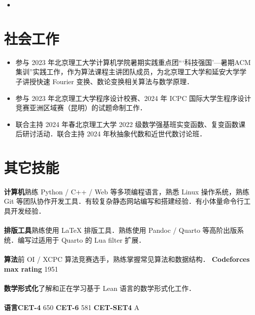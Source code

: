 \documentclass{resume}
\begin{document}
\begin{itemize}
\item {}
\end{itemize}

\section{社会工作}

\begin{itemize}
    \item 参与 2023 年北京理工大学计算机学院暑期实践重点团“‘科技强国’—暑期ACM集训”实践工作，作为算法课程主讲团队成员，为北京理工大学和延安大学学子讲授快速 Fourier 变换、数论变换相关算法与数学原理．
\end{itemize}


\begin{itemize}
    \item 参与 2023 年北京理工大学程序设计校赛、2024 年 ICPC 国际大学生程序设计竞赛亚洲区域赛（昆明）的试题命制工作．
\end{itemize}

\begin{itemize}
    \item 联合主持 2024 年春北京理工大学 2022 级数学强基班实变函数、复变函数课后研讨活动．联合主持 2024 年秋抽象代数和近世代数讨论班．
\end{itemize}

\section{其它技能}
\paragraph{}{\textbf{计算机}\quad 熟练 Python / C++ / Web 等多项编程语言，熟悉 Linux 操作系统，熟练 Git 等团队协作开发工具．有较复杂静态网站编写和搭建经验．有小体量命令行工具开发经验．}
\paragraph{}{\textbf{排版工具}\quad 熟练使用 LaTeX 排版工具．熟练使用 Pandoc / Quarto 等高阶出版系统．编写过适用于 Quarto 的 Lua filter 扩展．}
\paragraph{}{\textbf{算法}\quad 前 OI / XCPC 算法竞赛选手，熟练掌握常见算法和数据结构． \quad \textbf{Codeforces max rating} 1951}
\paragraph{}{\textbf{数学形式化}\quad 了解和正在学习基于 Lean 语言的数学形式化工作．}
\paragraph{}{\textbf{语言}\quad \textbf{CET-4} 650 \quad \textbf{CET-6} 581 \quad \textbf{CET-SET4} A}

\sepspace
\end{document}

